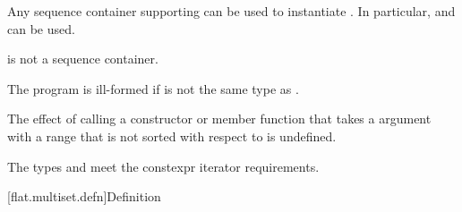 \pnum
Any sequence container
supporting 
can be used to instantiate .
In particular,
 and  can be used.
\begin{note}
 is not a sequence container.
\end{note}

\pnum
The program is ill-formed if  is not the same type
as .

\pnum
The effect of calling a constructor or member function
that takes a  argument with a range
that is not sorted with respect to  is undefined.

\pnum
The types  and  meet
the constexpr iterator requirements.

[flat.multiset.defn]{Definition}

